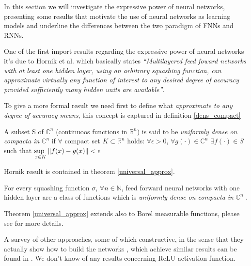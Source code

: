 In this section we will investigate the expressive power of neural networks, presenting some results that motivate the use of neural networks as learning
models and underline the differences between the two paradigm of FNNs and RNNs. 

One of the first import results regarding the expressive power of neural networks it's due to Hornik et al. \cite{Hornik89} which basically states
\textit{``Multilayered feed foward networks with at least one hidden layer, using an arbitrary squashing function, can approximate virtually any function
of interest to any desired degree of accuracy provided sufficiently many hidden units are available''}.

To give a more formal result we need first to define what \textit{approximate to any degree of accuracy means}, this concept is captured in definition
\ref{dens_compact}
 
\begin{defn}
 A subset S of $\mathbb{C}^n$ (continuoos functions in $\mathbb{R}^n$) is said to be \textit{uniformly dense on compacta in} $\mathbb{C}^n$ if $\forall$
 compact set $K\subset \mathbb{R}^n$ holds: $\forall \epsilon >0$, $\forall g(\cdot) \in \mathbb{C}^n$ $\exists f(\cdot) \in S$ such that 
 $\underset{x \in K}{\text{sup  }} \left\Vert f(x)-g(x) \right\Vert<\epsilon$ 
 \label{dens_compact}
\end{defn}

Hornik result is contained in theorem \ref{universal_approx}.
\begin{thm}
 For every squashing function $\sigma$, $\forall n\in \mathbb{N}$, feed forward neural
 networks with one hidden layer are a class of functions which is \textit{uniformly dense on compacta in} $\mathbb{C}^n$
\label{universal_approx}.
\end{thm}

Theorem \ref{universal_approx} extends also to Borel measurable functions, please see \cite{Hornik89} for more details.

A survey of other approaches, some of which constructive, in the sense that they actually show how to build the networks , which achieve similar results can be found in \cite{Scarselli98}.
We don't know of any results concerning ReLU activation function.

